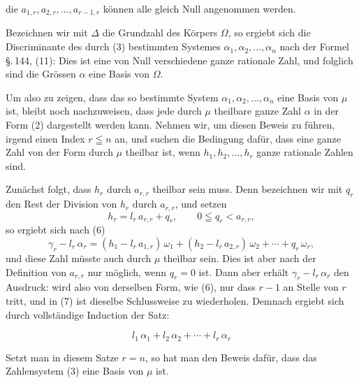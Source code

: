 
die $a_{1,r}, a_{2,r}, \ldots, a_{r-1,r}$ können alle gleich Null
angenommen werden.

Bezeichnen wir mit $\Delta$ die Grundzahl des Körpers $\Omega$, so
ergiebt sich die Discriminante des durch (3) bestimmten Systemes
$\alpha_1, \alpha_2, \ldots, \alpha_n$ nach der Formel \S.\,144, (11):
Dies ist eine von Null verschiedene ganze rationale Zahl, und folglich
sind die Grössen $\alpha$ eine Basis von $\Omega$.

Um also zu zeigen, dass das so bestimmte System $\alpha_1, \alpha_2,
\ldots, \alpha_n$ eine Basis von $\mu$ ist, bleibt noch nachzuweisen,
dass jede durch $\mu$ theilbare ganze Zahl $\alpha$ in der Form (2)
dargestellt werden kann. Nehmen wir, um diesen Beweis zu führen, irgend
einen Index $r \leqq n$ an, und suchen die Bedingung dafür, dass eine
ganze Zahl von der Form
durch $\mu$ theilbar ist, wenn $h_1, h_2, \ldots, h_r$ ganze rationale
Zahlen sind.

Zunächst folgt, dass $h_r$ durch $a_{r,r}$ theilbar sein muss. Denn
bezeichnen wir mit $q_r$ den Rest der Division von $h_r$ durch $a_{r,r}$,
und setzen
\[
h_r = l_r\,a_{r,r} + q_r, \qquad 0 \leqq q_r < a_{r,r},
\]
so ergiebt sich nach (6)
\[
\gamma_r - l_r\,\alpha_r = (h_1 - l_r\,a_{1,r})\,\omega_1 +
(h_2 - l_r\,a_{2,r})\,\omega_2 + \cdots + q_r\,\omega_r,
\]
und diese Zahl müsste auch durch $\mu$ theilbar sein. Dies ist aber nach
der Definition von $a_{r,r}$ nur möglich, wenn $q_r = 0$ ist. Dann aber
erhält $\gamma_r - l_r\,\alpha_r$ den Ausdruck:
wird also von derselben Form, wie (6), nur dass $r - 1$ an Stelle von $r$
tritt, und in (7) ist dieselbe Schlussweise zu wiederholen. Demnach
ergiebt sich durch vollständige Induction der Satz:

\[
l_1\,\alpha_1 + l_2\,\alpha_2 + \cdots + l_r\,\alpha_r
\]

Setzt man in diesem Satze $r = n$, so hat man den Beweis dafür, dass das
Zahlensystem (3) eine Basis von $\mu$ ist.
